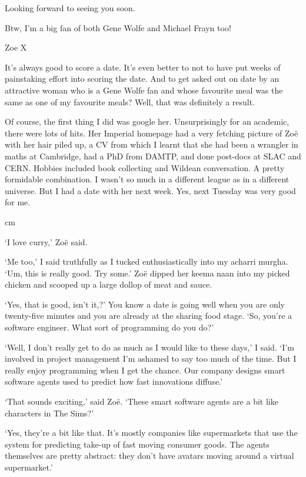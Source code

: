Looking forward to seeing you soon.

Btw, I'm a big fan of both Gene Wolfe and Michael Frayn too!

Zoe X
\stopmessage

It's always good to score a date. It's even better to not to have
put weeks of painstaking effort into scoring the date. And to get
asked out on date by an attractive woman who is a Gene Wolfe fan and
whose favourite meal was the same as one of my favourite meals?
Well, that was definitely a result.

Of course, the first thing I did was google her. Unsurprisingly for
an academic, there were lots of hits. Her Imperial homepage had a
very fetching picture of Zoë with her hair piled up, a CV from
which I learnt that she had been a wrangler in maths at Cambridge,
had a PhD from DAMTP, and done post-docs at SLAC and CERN. Hobbies
included book collecting and Wildean conversation. A pretty
formidable combination. I wasn't so much in a different league as in
a different universe. But I had a date with her next week. Yes, next
Tuesday was very good for me.

 cm

`I love curry,' Zoë said.

`Me too,' I said truthfully as I tucked enthusiastically into my
acharri murgha. `Um, this is really good. Try some.' Zoë dipped
her keema naan into my picked chicken and scooped up a large dollop
of meat and sauce.

`Yes, that is good, isn't it,?' You know a date is going well when
you are only twenty-five minutes and you are already at the sharing
food stage. `So, you're a software engineer. What sort of
programming do you do?'

`Well, I don't really get to do as much as I would like to these
days,' I said. `I'm involved in project management I'm ashamed to
say too much of the time. But I really enjoy programming when I get
the chance. Our company designs smart software agents used to
predict how fast innovations diffuse.'

`That sounds exciting,' said Zoë. `These smart software
agents are a bit like characters in {\twelvesl The Sims\/}?'

`Yes, they're a bit like that. It's mostly companies like supermarkets
that use the system for predicting take-up of fast moving consumer
goods. The agents themselves are pretty abstract: they don't have
avatars moving around a virtual supermarket.'

